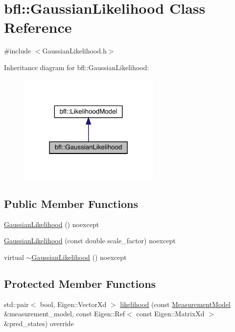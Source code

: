 \hypertarget{classbfl_1_1GaussianLikelihood}{}\section{bfl\+:\+:Gaussian\+Likelihood Class Reference}
\label{classbfl_1_1GaussianLikelihood}


{\ttfamily \#include $<$Gaussian\+Likelihood.\+h$>$}



Inheritance diagram for bfl\+:\+:Gaussian\+Likelihood\+:
\nopagebreak
\begin{figure}[H]
\begin{center}
\leavevmode
\includegraphics[width=199pt]{classbfl_1_1GaussianLikelihood__inherit__graph}
\end{center}
\end{figure}
\subsection*{Public Member Functions}
\begin{DoxyCompactItemize}
\item 
\mbox{\hyperlink{classbfl_1_1GaussianLikelihood_a431a2163fac8be200939266f28b62e6f}{Gaussian\+Likelihood}} () noexcept
\item 
\mbox{\hyperlink{classbfl_1_1GaussianLikelihood_ade56bbd79aa46bb5d97abcae2590489d}{Gaussian\+Likelihood}} (const double scale\+\_\+factor) noexcept
\item 
virtual \mbox{\hyperlink{classbfl_1_1GaussianLikelihood_a8d48eeeac83a3ac1a5e48913fdffa0d4}{$\sim$\+Gaussian\+Likelihood}} () noexcept
\end{DoxyCompactItemize}
\subsection*{Protected Member Functions}
\begin{DoxyCompactItemize}
\item 
std\+::pair$<$ bool, Eigen\+::\+Vector\+Xd $>$ \mbox{\hyperlink{classbfl_1_1GaussianLikelihood_a07bbe94864e1cf4ccb2232e51673575a}{likelihood}} (const \mbox{\hyperlink{classbfl_1_1MeasurementModel}{Measurement\+Model}} \&measurement\+\_\+model, const Eigen\+::\+Ref$<$ const Eigen\+::\+Matrix\+Xd $>$ \&pred\+\_\+states) override
\end{DoxyCompactItemize}
